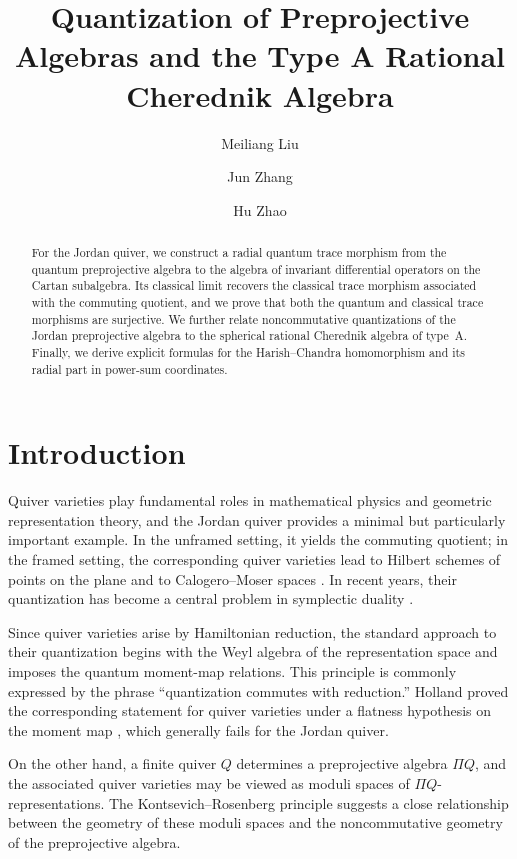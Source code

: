 \documentclass[11pt,reqno]{amsart}
\title[Quantization of Preprojective Algebras]{Quantization
of Preprojective Algebras and the Type A
Rational Cherednik Algebra}
\author{Meiliang Liu}
\author{Jun Zhang}
\author{Hu Zhao}
\date{}
\theoremstyle{definition}
\begin{document}
\begin{abstract}{
For the Jordan quiver, we construct a radial 
quantum trace morphism from the quantum 
preprojective algebra to the algebra of invariant 
differential operators on the Cartan subalgebra. 
Its classical limit recovers the classical trace 
morphism associated with the commuting quotient, 
and we prove that both the quantum and classical 
trace morphisms are surjective.
We further relate noncommutative quantizations of 
the Jordan preprojective algebra to the spherical 
rational Cherednik algebra of type~A. Finally, we 
derive explicit formulas for the Harish--Chandra 
homomorphism
and its radial part in power-sum coordinates.}
\end{abstract}


\maketitle
\tableofcontents
\section{Introduction}


 Quiver varieties play fundamental roles in mathematical physics and geometric representation theory, and the Jordan quiver provides a minimal but particularly important example.
In the unframed setting, it yields the commuting quotient; in the framed setting, the corresponding quiver varieties lead to Hilbert schemes of points on the plane and to Calogero--Moser spaces \cite{Nak1994Ins,Nak1998Qui,EG2002}.
In recent years,
their quantization has become a central problem in symplectic duality \cite{BLPB2016II}. 


 Since quiver varieties arise by Hamiltonian reduction, the standard approach to their quantization begins with the Weyl algebra of the representation space and imposes the quantum moment-map relations. This principle is commonly expressed by the phrase ``quantization commutes with reduction.'' Holland proved the corresponding statement for quiver varieties under a flatness hypothesis on the moment map \cite{Hol1999}, which generally fails for the Jordan quiver.


 {On the other hand, a finite quiver \(Q\) determines a preprojective algebra \(\Pi Q\), and the associated quiver varieties may be viewed as moduli spaces of \(\Pi Q\)-representations. The Kontsevich--Rosenberg principle suggests a close relationship between the geometry of these moduli spaces and the noncommutative geometry of the preprojective algebra.}
\end{document}
